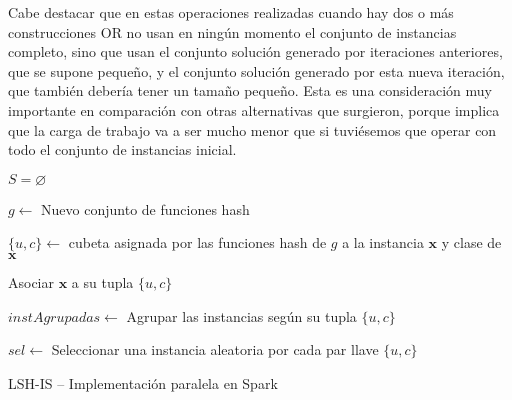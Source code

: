 Cabe destacar que en estas operaciones realizadas cuando hay dos o más construcciones OR no usan en ningún momento el conjunto de instancias completo, sino que usan el conjunto solución generado por iteraciones anteriores, que se supone pequeño, y el conjunto solución generado por esta nueva iteración, que también debería tener un tamaño pequeño. Esta es una consideración muy importante en comparación con otras alternativas que surgieron, porque implica que la carga de trabajo va a ser mucho menor que si tuviésemos que operar con todo el conjunto de instancias inicial.


\begin{algorithm*}
\DontPrintSemicolon
{}

$ S = \varnothing $

 {
	$g\leftarrow$ Nuevo conjunto de funciones hash
	
   {
		$\{u,c\}\leftarrow$ cubeta asignada por las funciones hash de $g$ a la instancia $\mathbf{x}$ y clase de $\mathbf{x}$ 

		Asociar $\mathbf{x}$ a su tupla $\{u,c\}$
	}
	
	$instAgrupadas\leftarrow$ Agrupar las instancias según su tupla $\{u,c\}$
	
	$sel\leftarrow$ Seleccionar una instancia aleatoria por cada par llave $\{u,c\}$
	
		
}

\caption{LSH-IS -- Implementación paralela en Spark}
\label{alg:LSHISSPARK}
\end{algorithm*}


